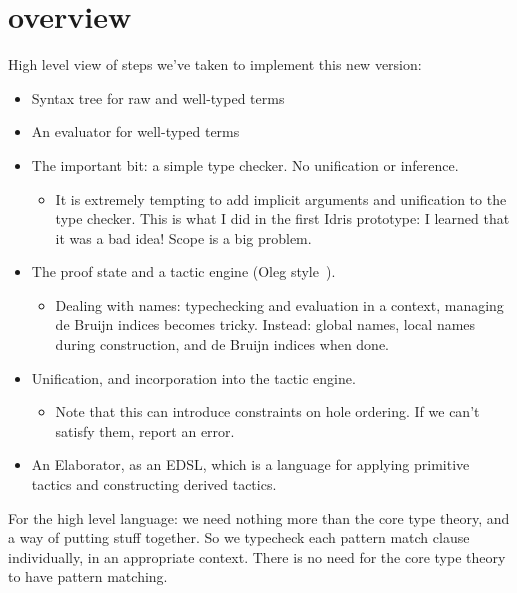 \section{overview}

High level view of steps we've taken to implement this new version:

\begin{itemize}
\item Syntax tree for raw and well-typed terms
\item An evaluator for well-typed terms
\item The important bit: a simple type checker. No unification or
  inference.
\begin{itemize}
  \item It is extremely tempting to add implicit arguments and unification to the
        type checker. This is what I did in the first Idris prototype: I learned
        that it was a bad idea! Scope is a big problem.
\end{itemize}
\item The proof state and a tactic engine (Oleg style~\cite{mcbride-thesis}).
\begin{itemize}
  \item Dealing with names: typechecking and evaluation in a context, managing de Bruijn
        indices becomes tricky. Instead: global names, local names during construction,
        and de Bruijn indices when done.
\end{itemize}
\item Unification, and incorporation into the tactic engine.
\begin{itemize}
  \item Note that this can introduce constraints on hole ordering. If we can't satisfy them,
        report an error.
\end{itemize}
\item An Elaborator, as an EDSL, which is a language for applying primitive tactics and
      constructing derived tactics.
\end{itemize}

For the high level language: we need nothing more than the core type theory,
and a way of putting stuff together. So we typecheck each pattern match clause
individually, in an appropriate context. There is no need for the core type
theory to have pattern matching.
